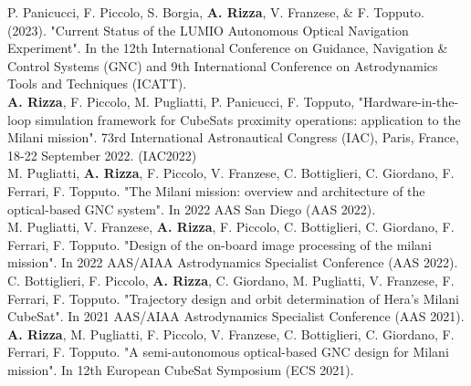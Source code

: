 \documentclass[
	a4paper,
	sidecolor=gray!8,
	sectioncolor=materialblue,
	subsectioncolor=materialindigo,
	profilepicsize=3.5cm,
	profilepicstyle=profilecircle,
	profilepiczoom=1.15,
]{sixtysecondscv}
\begin{document}
P. Panicucci, F. Piccolo, S. Borgia, \textbf{A. Rizza}, V. Franzese, & F. Topputo. (2023). "Current Status of the LUMIO Autonomous Optical Navigation Experiment". In the 12th International Conference on Guidance, Navigation \& Control Systems (GNC) and 9th International Conference on Astrodynamics Tools and Techniques (ICATT).\\

\textbf{A. Rizza}, F. Piccolo, M. Pugliatti, P. Panicucci, F. Topputo, "Hardware-in-the-loop simulation framework for CubeSats proximity operations: application to the Milani mission". 73rd International Astronautical Congress (IAC), Paris, France, 18-22 September 2022. (IAC2022)\\

M. Pugliatti, \textbf{A. Rizza}, F. Piccolo, V. Franzese, C. Bottiglieri, C. Giordano, F. Ferrari, F. Topputo. "The Milani mission: overview and architecture of the optical-based GNC system". In 2022 AAS San Diego (AAS 2022).\\

M. Pugliatti, V. Franzese, \textbf{A. Rizza}, F. Piccolo, C. Bottiglieri, C. Giordano, F. Ferrari, F. Topputo. "Design of the on-board image processing of the milani mission". In 2022 AAS/AIAA Astrodynamics Specialist Conference (AAS 2022).\\

C. Bottiglieri, F. Piccolo, \textbf{A. Rizza}, C. Giordano, M. Pugliatti, V. Franzese, F. Ferrari, F. Topputo. "Trajectory design and orbit determination of Hera's Milani CubeSat". In 2021 AAS/AIAA Astrodynamics Specialist Conference (AAS 2021).\\

\textbf{A. Rizza}, M. Pugliatti, F. Piccolo, V. Franzese, C. Bottiglieri, C. Giordano, F. Ferrari, F. Topputo. "A semi-autonomous optical-based GNC design for Milani mission". In 12th European CubeSat Symposium (ECS 2021).
\end{document}
